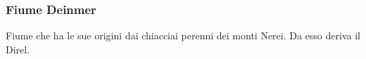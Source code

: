 \subsubsection{Fiume Deinmer}\label{loc:deinmer}
Fiume che ha le sue origini dai chiacciai perenni dei monti Nerei. Da esso
deriva il Direl.
